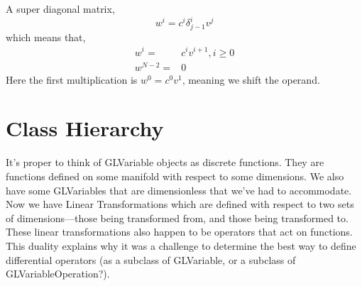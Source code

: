\documentclass[11pt]{article}
\begin{document}
A super diagonal matrix,
\begin{equation}
w^i = c^i \delta^i_{j-1} v^j
\end{equation}
which means that,
\begin{align}
w^i = & c^i v^{i+1}, i \geqslant 0\\
w^{N-2} =& 0
\end{align}
Here the first multiplication is $w^0 = c^0 v^1$, meaning we shift the operand.

\section{Class Hierarchy}

It's proper to think of GLVariable objects as discrete functions. They are functions defined on some manifold with respect to some dimensions. We also have some GLVariables that are dimensionless that we've had to accommodate. Now we have Linear Transformations which are defined with respect to two sets of dimensions---those being transformed from, and those being transformed to. These linear transformations also happen to be operators that act on functions. This duality explains why it was a challenge to determine the best way to define differential operators (as a subclass of GLVariable, or a subclass of GLVariableOperation?).
\end{document}
